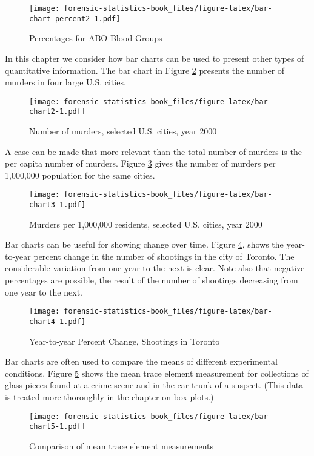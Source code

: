 \documentclass[
]{book}
\begin{document}
\begin{figure}
\centering
\texttt{[image: forensic-statistics-book\_files/figure-latex/bar-chart-percent2-1.pdf]}
\caption{\label{fig:bar-chart-percent2}Percentages for ABO Blood Groups}
\end{figure}

In this chapter we consider how bar charts can be used to present other
types of quantitative information. The bar chart in Figure \ref{fig:bar-chart2}
presents the number of murders in four large U.S. cities.

\begin{figure}
\centering
\texttt{[image: forensic-statistics-book\_files/figure-latex/bar-chart2-1.pdf]}
\caption{\label{fig:bar-chart2}Number of murders, selected U.S. cities, year 2000}
\end{figure}

A case can be made that more relevant than the total number of murders is
the per capita number of murders. Figure \ref{fig:bar-chart3} gives the
number of murders per 1,000,000 population for the same cities.

\begin{figure}
\centering
\texttt{[image: forensic-statistics-book\_files/figure-latex/bar-chart3-1.pdf]}
\caption{\label{fig:bar-chart3}Murders per 1,000,000 residents, selected U.S. cities, year 2000}
\end{figure}

Bar charts can be useful for showing change over time. Figure \ref{fig:bar-chart4},
shows the year-to-year percent change in the number of shootings in the city of
Toronto. The considerable variation from one year to the next is clear. Note also
that negative percentages are possible, the result of the number of shootings
decreasing from one year to the next.

\begin{figure}
\centering
\texttt{[image: forensic-statistics-book\_files/figure-latex/bar-chart4-1.pdf]}
\caption{\label{fig:bar-chart4}Year-to-year Percent Change, Shootings in Toronto}
\end{figure}

Bar charts are often used to compare the means of different experimental
conditions. Figure \ref{fig:bar-chart5} shows the mean trace element
measurement for collections of glass pieces found at a crime scene and
in the car trunk of a suspect. (This data is treated more thoroughly
in the chapter on box plots.)

\begin{figure}
\centering
\texttt{[image: forensic-statistics-book\_files/figure-latex/bar-chart5-1.pdf]}
\caption{\label{fig:bar-chart5}Comparison of mean trace element measurements}
\end{figure}
\end{document}
